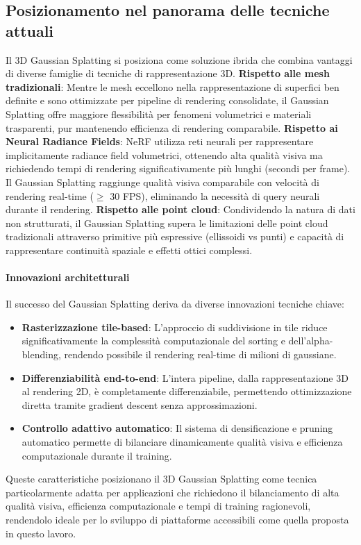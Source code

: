 \subsection{Posizionamento nel panorama delle tecniche attuali}
Il 3D Gaussian Splatting si posiziona come soluzione ibrida che combina vantaggi di diverse famiglie di tecniche di rappresentazione 3D.
\newline
\newline
\textbf{Rispetto alle mesh tradizionali}: Mentre le mesh eccellono nella rappresentazione di superfici ben definite e sono ottimizzate per pipeline di rendering consolidate, il Gaussian Splatting offre maggiore flessibilità per fenomeni volumetrici e materiali trasparenti, pur mantenendo efficienza di rendering comparabile.
\newline
\newline
\textbf{Rispetto ai Neural Radiance Fields}: NeRF utilizza reti neurali per rappresentare implicitamente radiance field volumetrici, ottenendo alta qualità visiva ma richiedendo tempi di rendering significativamente più lunghi (secondi per frame). Il Gaussian Splatting raggiunge qualità visiva comparabile con velocità di rendering real-time ($\geq$ 30 FPS), eliminando la necessità di query neurali durante il rendering.
\newline
\newline
\textbf{Rispetto alle point cloud}: Condividendo la natura di dati non strutturati, il Gaussian Splatting supera le limitazioni delle point cloud tradizionali attraverso primitive più espressive (ellissoidi vs punti) e capacità di rappresentare continuità spaziale e effetti ottici complessi.

\paragraph{Innovazioni architetturali}
Il successo del Gaussian Splatting deriva da diverse innovazioni tecniche chiave:
\begin{itemize}
    \item \textbf{Rasterizzazione tile-based}: L'approccio di suddivisione in tile riduce significativamente la complessità computazionale del sorting e dell'alpha-blending, rendendo possibile il rendering real-time di milioni di gaussiane.
    \item \textbf{Differenziabilità end-to-end}: L'intera pipeline, dalla rappresentazione 3D al rendering 2D, è completamente differenziabile, permettendo ottimizzazione diretta tramite gradient descent senza approssimazioni.
    \item \textbf{Controllo adattivo automatico}: Il sistema di densificazione e pruning automatico permette di bilanciare dinamicamente qualità visiva e efficienza computazionale durante il training.
\end{itemize}
Queste caratteristiche posizionano il 3D Gaussian Splatting come tecnica particolarmente adatta per applicazioni che richiedono il bilanciamento di alta qualità visiva, efficienza computazionale e tempi di training ragionevoli, rendendolo ideale per lo sviluppo di piattaforme accessibili come quella proposta in questo lavoro.


